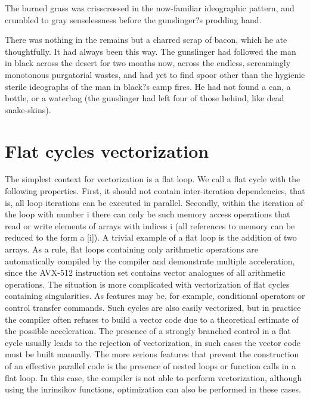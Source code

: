 \documentclass[
11pt,%
tightenlines,%
twoside,%
onecolumn,%
nofloats,%
nobibnotes,%
nofootinbib,%
superscriptaddress,%
noshowpacs,%
centertags]%
{revtex4}
\begin{document}
The burned grass was crisscrossed in the now-familiar ideographic pattern, and crumbled to gray senselessness before the gunslinger?s prodding hand. 

There was nothing in the remains but a charred scrap of bacon, which he ate thoughtfully. It had always been this way. The gunslinger had followed the man in black across the desert for two months now, across the endless, screamingly monotonous purgatorial wastes, and had yet to find spoor other than the hygienic sterile ideographs of the man in black?s camp fires. He had not found a can, a bottle, or a waterbag (the gunslinger had left four of those behind, like dead snake-skins).

\section{Flat cycles vectorization}

The simplest context for vectorization is a flat loop. We call a flat cycle with the following properties. First, it should not contain inter-iteration dependencies, that is, all loop iterations can be executed in parallel. Secondly, within the iteration of the loop with number i there can only be such memory access operations that read or write elements of arrays with indices i (all references to memory can be reduced to the form a [i]). A trivial example of a flat loop is the addition of two arrays. As a rule, flat loops containing only arithmetic operations are automatically compiled by the compiler and demonstrate multiple acceleration, since the AVX-512 instruction set contains vector analogues of all arithmetic operations. The situation is more complicated with vectorization of flat cycles containing singularities. As features may be, for example, conditional operators or control transfer commands. Such cycles are also easily vectorized, but in practice the compiler often refuses to build a vector code due to a theoretical estimate of the possible acceleration. The presence of a strongly branched control in a flat cycle usually leads to the rejection of vectorization, in such cases the vector code must be built manually. The more serious features that prevent the construction of an effective parallel code is the presence of nested loops or function calls in a flat loop. In this case, the compiler is not able to perform vectorization, although using the inrinsikov functions, optimization can also be performed in these cases.
\end{document}
